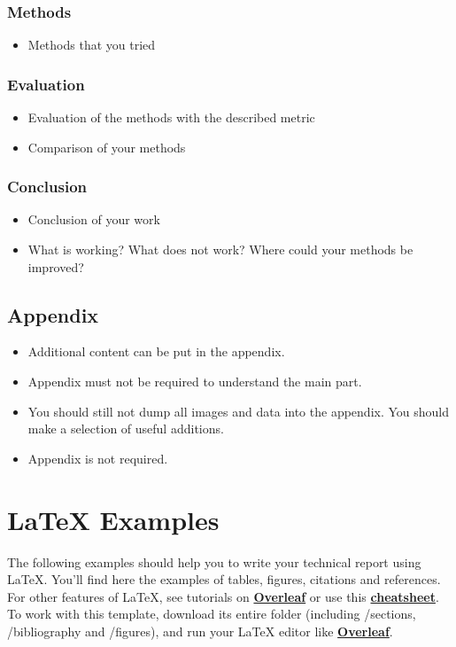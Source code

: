 \subsubsection*{Methods}
\begin{itemize}
    \item Methods that you tried
\end{itemize}


\subsubsection*{Evaluation}
\begin{itemize}
    \item Evaluation of the methods with the described metric
    \item Comparison of your methods
\end{itemize}


\subsubsection*{Conclusion}
\begin{itemize}
    \item Conclusion of your work
    \item What is working? What does not work? Where could your methods be improved?
\end{itemize}


\subsection*{Appendix}
\begin{itemize}
    \item Additional content can be put in the appendix.
    \item Appendix must not be required to understand the main part.
    \item You should still not dump all images and data into the appendix. You should make a selection of useful additions.
    \item Appendix is not required.
\end{itemize}


\clearpage
\section{\LaTeX{} Examples}
The following examples should help you to write your technical report using \LaTeX{}. You'll find here the examples of tables, figures, citations and references. For other features of \LaTeX{}, see tutorials on \href{https://www.overleaf.com/learn}{\textbf{Overleaf}} or use this \href{https://wch.github.io/latexsheet/}{\textbf{cheatsheet}}. To work with this template, download its entire folder (including /sections, /bibliography and /figures), and run your \LaTeX{} editor like \href{https://www.overleaf.com}{\textbf{Overleaf}}.


